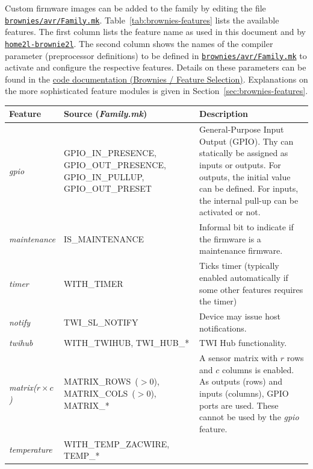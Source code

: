 \documentclass[12pt,english,parskip=half,headheight=19pt]{scrreprt}
\newcommand{\idx}[1]{#1\index{#1}}
\newcommand{\reftool}[1]{\hyperref[tool:#1]{\texttt{\idx{#1}}}}
\newcommand{\refsrc}[1]{\href{#1}{\texttt{#1}}}     %
\newcommand{\refapicgroup}[2]{\href{home2l-api_c/group__#1.html}{#2}}
\begin{document}
Custom firmware images can be added to the family by editing the file \refsrc{brownies/avr/Family.mk}. Table~\ref{tab:brownies-features} lists the available features. The first column lists the feature name as used in this document and by \reftool{home2l-brownie2l}. The second column shows the names of the compiler parameter (preprocessor definitions) to be defined in \refsrc{brownies/avr/Family.mk} to activate and configure the respective features. Details on these parameters can be found in the \refapicgroup{brownies__features}{code documentation (Brownies / Feature Selection)}. Explanations on the more sophisticated feature modules is given in Section~\ref{sec:brownies-features}.

\begin{table}[htp]
  \centering
  \renewcommand{\arraystretch}{1.4}
  \begin{tabular}{l|p{5cm}|p{8cm}}
    Feature & Source (\textit{Family.mk}) & Description \\
    \hline \hline
    \textit{gpio} &
        GPIO\_IN\_PRESENCE, GPIO\_OUT\_PRESENCE, GPIO\_IN\_PULLUP, GPIO\_OUT\_PRESET &
        General-Purpose Input Output (GPIO). \newline Thy can statically be assigned as
        inputs or outputs. For outputs, the initial value can be defined. For inputs, the
        internal pull-up can be activated or not. \\
    \hline
    \textit{maintenance} &
        IS\_MAINTENANCE &
        Informal bit to indicate if the firmware is a maintenance firmware.
        \\
    \hline
    \textit{timer} &
        WITH\_TIMER &
        Ticks timer (typically enabled automatically if some other features
        requires the timer) \\
    \hline
    \textit{notify} &
        TWI\_SL\_NOTIFY &
        Device may issue host notifications. \\
    \hline
    \textit{twihub} &
        WITH\_TWIHUB, TWI\_HUB\_* &
        TWI Hub functionality.
        \\
    \hline
    \textit{matrix($r\times{c}$)} &
        \mbox{MATRIX\_ROWS ($>0$),} \mbox{MATRIX\_COLS ($>0$),} \newline MATRIX\_* &
        A sensor matrix with $r$ rows and $c$ columns is enabled. As outputs (rows) and
        inputs (columns), GPIO ports are used. These cannot be used by the \textit{gpio}
        feature.
        \\
    \hline
    \textit{temperature} &
        WITH\_TEMP\_ZACWIRE, \newline TEMP\_* &

\end{tabular}
\end{table}
\end{document}
